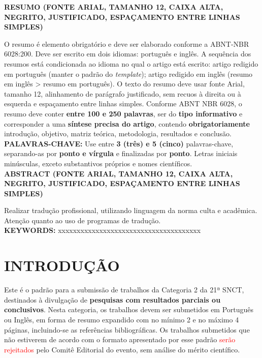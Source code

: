 \documentclass[12pt, a4paper]{article}
\begin{document}
{\setlength{\parindent}{0cm} \singlespacing %
\textbf{RESUMO (FONTE ARIAL, TAMANHO 12, CAIXA ALTA, NEGRITO, JUSTIFICADO, ESPAÇAMENTO ENTRE LINHAS SIMPLES)}

O resumo é elemento obrigatório e deve ser elaborado conforme a ABNT-NBR 6028:200. Deve ser escrito em dois idiomas: português e inglês. A sequência dos resumos está condicionada ao idioma no qual o artigo está escrito: artigo redigido em português (manter o padrão do \textit{template}); artigo redigido em inglês (resumo em inglês > resumo em português). O texto do resumo deve usar fonte Arial, tamanho 12, alinhamento de parágrafo justificado, sem recuos à direita ou à esquerda e espaçamento entre linhas simples. Conforme ABNT NBR 6028, o resumo deve conter \textbf{entre 100 e 250 palavras}, ser do \textbf{tipo informativo} e corresponder a uma \textbf{síntese precisa do artigo}, contendo \textbf{obrigatoriamente} introdução, objetivo, matriz teórica, metodologia, resultados e conclusão.\\

\textbf{PALAVRAS-CHAVE:} Use entre \textbf{3 (três) e 5 (cinco)} palavras-chave, separando-as por \textbf{ponto e vírgula} e finalizadas por \textbf{ponto}. Letras iniciais minúsculas, exceto substantivos próprios e nomes científicos.\\

\textbf{ABSTRACT (FONTE ARIAL, TAMANHO 12, CAIXA ALTA, NEGRITO, JUSTIFICADO, ESPAÇAMENTO ENTRE LINHAS SIMPLES)}

Realizar tradução profissional, utilizando linguagem da norma culta e acadêmica. Atenção quanto ao uso de programas de tradução.\\

\textbf{KEYWORDS:} xxxxxxxxxxxxxxxxxxxxxxxxxxxxxxxxxxxxxx

}
\pagestyle{otherpages}
\section{INTRODUÇÃO}
Este é o padrão para a submissão de trabalhos da Categoria 2 da 21ª SNCT, destinados à divulgação de \textbf{pesquisas com resultados parciais ou conclusivos}. Nesta categoria, os trabalhos devem ser submetidos em Português ou Inglês, em forma de resumo expandido com no mínimo 2 e no máximo 4 páginas, incluindo-se as referências bibliográficas. Os trabalhos submetidos que não estiverem de acordo com o formato apresentado por esse padrão \textcolor{red}{serão rejeitados} pelo Comitê Editorial do evento, sem análise do mérito científico.
\end{document}
